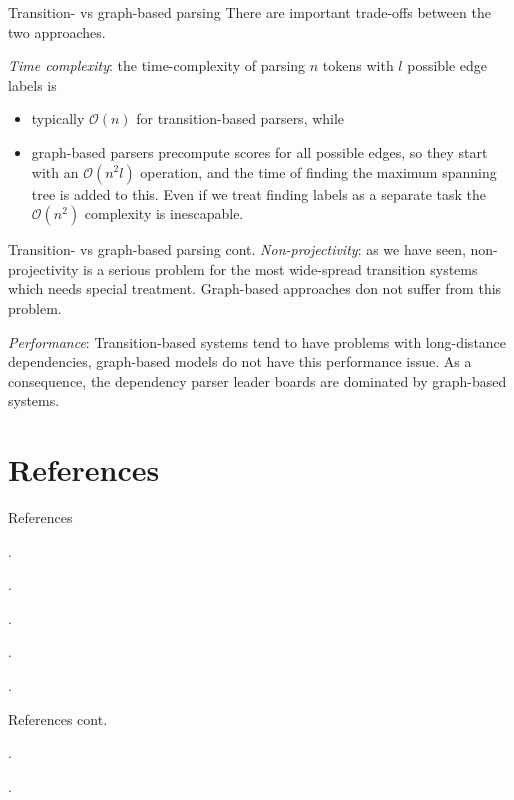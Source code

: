 \documentclass[style=upen, size=14pt]{powerdot}
\newcommand{\gold}{\color{arany}}
\theoremstyle{definition}
\begin{document}
\begin{slide}[toc=Trade-offs]{Transition- vs graph-based parsing}
There are important trade-offs between the two approaches.\bigskip

\emph{\gold Time complexity}: the time-complexity of parsing $n$ tokens with $l$
possible edge labels is

\begin{itemize}
\item typically $\mathcal O (n)$ for transition-based parsers, while
\item graph-based parsers precompute scores for all possible edges, so they
  start with an $\mathcal O(n^2 l)$ operation, and the time of finding the
  maximum spanning tree is added to this. Even if we treat finding labels as a
  separate task the $\mathcal O(n^2)$ complexity is inescapable.
\end{itemize}
\end{slide}

\begin{slide}[toc=]{Transition- vs graph-based parsing cont.}
\emph{\gold Non-projectivity}: as we have seen, non-projectivity is a serious problem
for the most wide-spread transition systems which needs special treatment.
Graph-based approaches don not suffer from this problem.\bigskip

\emph{\gold Performance}: Transition-based systems tend to have problems with
long-distance dependencies, graph-based models do not have this performance
issue. As a consequence, the dependency parser leader boards are dominated by
graph-based systems.
\end{slide}
\section{References}

\begin{slide}{References}
  
  \begin{footnotesize}

    .\medskip

    .\medskip

    .\medskip
    
    .\medskip

    .\medskip
    
  \end{footnotesize}
\end{slide}

\begin{slide}[toc=]{References cont.}
  \begin{footnotesize}

    .\medskip

    .\medskip
    
  \end{footnotesize}
\end{slide}
\end{document}
